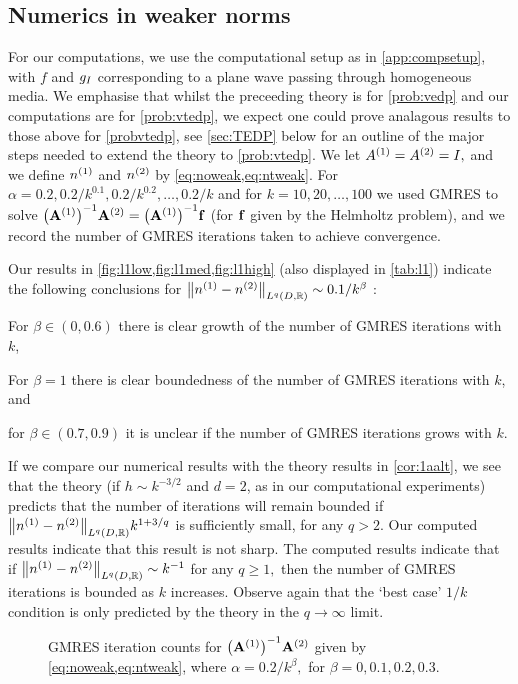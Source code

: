 \subsection{Numerics in weaker norms}\label{sec:weakernumerics}
For our computations, we use the computational setup as in \cref{app:compsetup}, with $f$ and $g_{I}$ corresponding to a plane wave passing through homogeneous media. We emphasise that whilst the preceeding theory is for \cref{prob:vedp} and our computations are for \cref{prob:vtedp}, we expect one could prove analagous results to those above for \cref{probvtedp}, see \cref{sec:TEDP} below for an outline of the major steps needed to extend the theory to \cref{prob:vtedp}. We let ${A}^{(1)}={A}^{(2)}=I,$ and we define ${n}^{(1)}$ and ${n}^{(2)}$ by \cref{eq:noweak,eq:ntweak}. For $\alpha = 0.2,0.2/k^{0.1},0.2/k^{0.2},\ldots,0.2/k$ and for $k=10,20,\ldots,100$ we used GMRES to solve $\AmatoI\Amatt = \AmatoI \bff$ (for $\mathbf{f}$ given by the Helmholtz problem), and we record the number of GMRES iterations taken to achieve convergence.

Our results in \cref{fig:l1low,fig:l1med,fig:l1high} (also displayed in \cref{tab:l1}) indicate the following conclusions for $\NLqDRR{\nso-\nst} \sim 0.1/k^{\beta}$ :
\bit
\item For $\beta \in (0,0.6)$ there is clear growth of the number of GMRES iterations with $k$,
\item For $\beta = 1$ there is clear boundedness of the number of GMRES iterations with $k$, and
  \item for $\beta \in (0.7,0.9)$ it is unclear if the number of GMRES iterations grows with $k.$
\eit

If we compare our numerical results with the theory results in \cref{cor:1aalt}, we see that the theory (if $h \sim k^{-3/2}$ and $d=2$, as in our computational experiments) predicts that the number of iterations will remain bounded if $\NLqDRR{\nso-\nst} k^{1+3/q}$ is sufficiently small, for any $q > 2.$ Our computed results indicate that this result is not sharp. The computed results indicate that if $\NLqDRR{\nso-\nst} \sim k^{-1}$ for any $q \geq 1,$ then the number of GMRES iterations is bounded as $k$ increases. Observe again that the `best case' $1/k$ condition is only predicted by the theory in the $q\rightarrow \infty$ limit.

\begin{figure}

  \caption{GMRES iteration counts for $\AmatoI\Amatt$ given by \cref{eq:noweak,eq:ntweak}, where $\alpha = 0.2/k^\beta,$ for $\beta = 0,0.1,0.2,0.3.$}\label{fig:l1low}
\end{figure}

